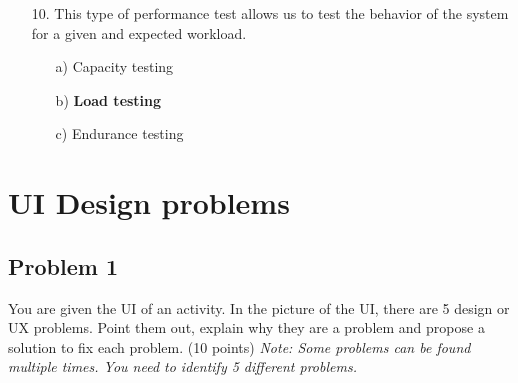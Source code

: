 \documentclass[12pt]{book}
\begin{document}
\begin{itemize}
    \item[10.] This type of performance test allows us to test the behavior of the system for a given and expected workload.
    \begin{itemize}
        \item[a)] Capacity testing
        \item[b)] \textbf{Load testing}
        \item[c)] Endurance testing
    \end{itemize} 

\end{itemize}
\chapter{UI Design problems}
\newpage
\section*{Problem 1}

You are given the UI of an activity. In the picture of the UI, there are 5 design or UX problems. Point them out, explain why they are a problem and propose a solution to fix each problem. (10 points) 
\textit{Note: Some problems can be found multiple times. You need to identify 5 different problems.}
\end{document}
